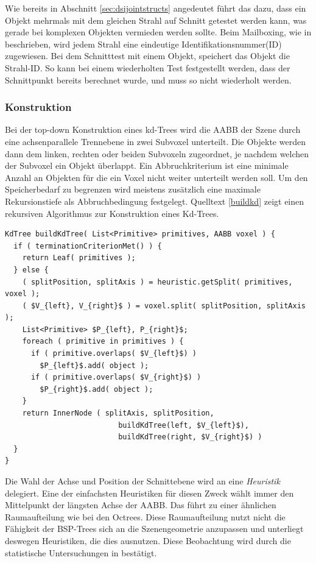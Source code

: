 Wie bereits in Abschnitt \ref{sec:dsijointstructs} angedeutet führt das dazu, dass ein Objekt mehrmals mit dem gleichen Strahl auf Schnitt getestet werden kann, was gerade bei komplexen Objekten vermieden werden sollte. Beim Mailboxing, wie in \cite{Benthin06} beschrieben, wird jedem Strahl eine eindeutige Identifikationsnummer(ID) zugewiesen. Bei dem Schnitttest mit einem Objekt, speichert das Objekt die Strahl-ID. So kann bei einem wiederholten Test festgestellt werden, dass der Schnittpunkt bereits berechnet wurde, und muss so nicht wiederholt werden.

\subsubsection{Konstruktion}

Bei der top-down Konstruktion eines kd-Trees wird die AABB der Szene durch eine achsenparallele Trennebene in zwei Subvoxel unterteilt. Die Objekte werden dann dem linken, rechten oder beiden Subvoxeln zugeordnet, je nachdem welchen der Subvoxel ein Objekt überlappt. Ein Abbruchkriterium ist eine minimale Anzahl an Objekten für die ein Voxel nicht weiter unterteilt werden soll. Um den Speicherbedarf zu begrenzen wird meistens zusätzlich eine maximale Rekursionstiefe als Abbruchbedingung festgelegt.
Quelltext \ref{buildkd} zeigt einen rekursiven Algorithmus zur Konstruktion eines Kd-Trees.


\begin{lstlisting}[mathescape,float,caption=Eine einfache Version eines Konstruktionsalgorithmus für kd-Trees,label=buildkd]
KdTree buildKdTree( List<Primitive> primitives, AABB voxel ) {
  if ( terminationCriterionMet() ) {
    return Leaf( primitives );
  } else {
    ( splitPosition, splitAxis ) = heuristic.getSplit( primitives, voxel );
    ( $V_{left}, V_{right}$ ) = voxel.split( splitPosition, splitAxis );
    List<Primitive> $P_{left}, P_{right}$;
    foreach ( primitive in primitives ) {
      if ( primitive.overlaps( $V_{left}$) )
        $P_{left}$.add( object );
      if ( primitive.overlaps( $V_{right}$) )
        $P_{right}$.add( object );
    }
    return InnerNode ( splitAxis, splitPosition,
                          buildKdTree(left, $V_{left}$),
                          buildKdTree(right, $V_{right}$) )
  }
}\end{lstlisting}

Die Wahl der Achse und Position der Schnittebene wird an eine \textit{Heuristik} delegiert. Eine der einfachsten Heuristiken für diesen Zweck wählt immer den Mittelpunkt der längsten Achse der AABB. Das führt zu einer ähnlichen Raumaufteilung wie bei den Octrees. Diese Raumaufteilung nutzt nicht die Fähigkeit der BSP-Trees sich an die Szenengeometrie anzupassen und unterliegt deswegen Heuristiken, die dies ausnutzen. Diese Beobachtung wird durch die statistische Untersuchungen in \cite{Havran00} bestätigt.


